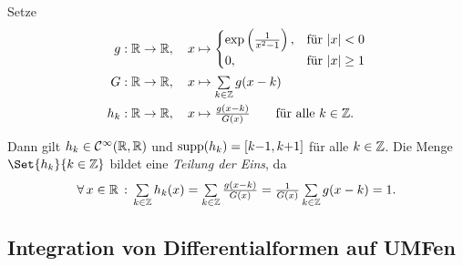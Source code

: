 \documentclass{cheat-sheet}
\theoremstyle{definition}
\begin{document}
\begin{samepage}

\begin{bem}
  Setze %
  \begin{align*}
    g : \R \to \R, \quad x &\mapsto \begin{cases} \exp \left( \tfrac{1}{x^2 - 1} \right), & \text{für } \abs{x} < 0 \\ 0, & \text{für } \abs{x} \geq 1 \end{cases} \\
    G : \R \to \R, \quad x &\mapsto \sum_{k \in \Z} g(x-k) \\
    h_k : \R \to \R, \quad x &\mapsto \tfrac{g(x-k)}{G(x)} \qquad \text{für alle $k \in \Z$.}
  \end{align*}

  Dann gilt $h_k \in \mathcal{C}^\infty(\mathbb{R}, \mathbb{R})$ und $\mathop{\mathrm{supp}}(h_k) = \left[ k{-}1, k{+}1 \right]$ für alle $k \in \mathbb{Z}$.
  Die Menge $\Set{h_k}{k \in \Z}$ bildet eine \emph{Teilung der Eins}, da
  \[ \fa{x \in \R} \sum_{k \in \Z} h_k(x) = \sum_{k \in \Z} \tfrac{g(x-k)}{G(x)} = \tfrac{1}{G(x)} \sum_{k \in \Z} g(x-k) = 1. \]
\end{bem}

\iffalse
  Sei $q = (q_1, ..., q_n) \in \Z^n$, $\epsilon > 0$

  $\d \alpha_{q,\epsilon} : \R^n \to \R, (x_1, ..., x_n) \mapsto \prod_{j=1}^{n} h_{q_j} \cdot (\frac{x_j}{\epsilon})$

  Es gilt:

  \begin{itemize}
    \item $\d \alpha_{q, \epsilon}$ ist $\mathcal{C}^\infty$
    \item $\mathrm{supp} \alpha_{q,\epsilon} = \Set{ (x_1, ..., x_n) \in \R^n }{ \abs{x_j - \epsilon q_j} \leq \epsilon \text{ für alle } j \in \{ 1, ..., n \} }$
    \item $\sum_{q \in \Z^n} \alpha_{q, \epsilon} = 1$ (Übung)
  \end{itemize}
\fi


\subsection{Integration von Differentialformen auf UMFen}

\end{samepage}
\end{document}
